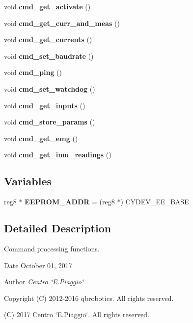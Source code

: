 \begin{DoxyCompactItemize}
\mbox{\label{command__processing_8c_a554d563001517bfbc44400a1e999b393}} 
void {\bfseries cmd\+\_\+get\+\_\+activate} ()
\item 
\mbox{\label{command__processing_8c_a45a90a8455bfdb6a7f0e118da2c6f0a6}} 
void {\bfseries cmd\+\_\+get\+\_\+curr\+\_\+and\+\_\+meas} ()
\item 
\mbox{\label{command__processing_8c_aaf613e251c1e14fe4fffe3e9e033f9f7}} 
void {\bfseries cmd\+\_\+get\+\_\+currents} ()
\item 
\mbox{\label{command__processing_8c_aa86bf1f2fa69ab5927f7e4e40eb40581}} 
void {\bfseries cmd\+\_\+set\+\_\+baudrate} ()
\item 
\mbox{\label{command__processing_8c_a704f8c8cb0f4d75f243fc2b79bc34188}} 
void {\bfseries cmd\+\_\+ping} ()
\item 
\mbox{\label{command__processing_8c_aa94cd9c2e2fbfc5b98e84f67569cfe82}} 
void {\bfseries cmd\+\_\+set\+\_\+watchdog} ()
\item 
\mbox{\label{command__processing_8c_a20db4694e8caa572ec479f73ce8b3b02}} 
void {\bfseries cmd\+\_\+get\+\_\+inputs} ()
\item 
\mbox{\label{command__processing_8c_a1a2493bfc2f30171d7e7a3bd5aebab14}} 
void {\bfseries cmd\+\_\+store\+\_\+params} ()
\item 
\mbox{\label{command__processing_8c_ae579c6ac56fef33632f9c9f2c42b90a0}} 
void {\bfseries cmd\+\_\+get\+\_\+emg} ()
\item 
\mbox{\label{command__processing_8c_a40f7c67690279132ab72019b76165cb8}} 
void {\bfseries cmd\+\_\+get\+\_\+imu\+\_\+readings} ()
\end{DoxyCompactItemize}
\subsection*{Variables}
\begin{DoxyCompactItemize}
\item 
\mbox{\label{command__processing_8c_aba5b9353e6d38cc61eb2bd363df61248}} 
reg8 $\ast$ {\bfseries E\+E\+P\+R\+O\+M\+\_\+\+A\+D\+DR} = (reg8 $\ast$) C\+Y\+D\+E\+V\+\_\+\+E\+E\+\_\+\+B\+A\+SE
\end{DoxyCompactItemize}


\subsection{Detailed Description}
Command processing functions. 

\begin{DoxyDate}{Date}
October 01, 2017 
\end{DoxyDate}
\begin{DoxyAuthor}{Author}
{\itshape Centro \char`\"{}\+E.\+Piaggio\char`\"{}} 
\end{DoxyAuthor}
\begin{DoxyCopyright}{Copyright}
(C) 2012-\/2016 qbrobotics. All rights reserved. 

(C) 2017 Centro \char`\"{}\+E.\+Piaggio\char`\"{}. All rights reserved. 
\end{DoxyCopyright}


